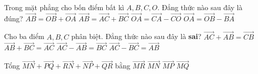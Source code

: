 

\begin{ex}%
	Trong mặt phẳng cho bốn điểm bất kì $A,B,C,O$. Đẳng thức nào sau đây là đúng?
	\choice
	{$\overrightarrow{AB}=\overrightarrow{OB}+\overrightarrow{OA}$}
	{$\overrightarrow{AB}=\overrightarrow{AC}+\overrightarrow{BC}$}
	{\True $\overrightarrow{OA}=\overrightarrow{CA}-\overrightarrow{CO}$}
	{$\overrightarrow{OA}=\overrightarrow{OB}-\overrightarrow{BA}$}
\end{ex}
\begin{ex}%
	Cho ba điểm $A,B,C$ phân biệt. Đẳng thức nào sau đây là \textbf{sai}?
	\choice
	{\True $\overrightarrow{AC}+\overrightarrow{AB}=\overrightarrow{CB}$}
	{$\overrightarrow{AB}+\overrightarrow{BC}=\overrightarrow{AC}$}
	{$\overrightarrow{AC}-\overrightarrow{AB}=\overrightarrow{BC}$}
	{$\overrightarrow{AC}-\overrightarrow{BC}=\overrightarrow{AB}$}
\end{ex}

\begin{ex}%
	Tổng $\overrightarrow{MN}+\overrightarrow{PQ}+\overrightarrow{RN}+\overrightarrow{NP}+\overrightarrow{QR}$ bằng
	\choice
	{$\overrightarrow{MR}$}
	{\True $\overrightarrow{MN}$}
	{$\overrightarrow{MP}$}
	{$\overrightarrow{MQ}$}
\end{ex}

